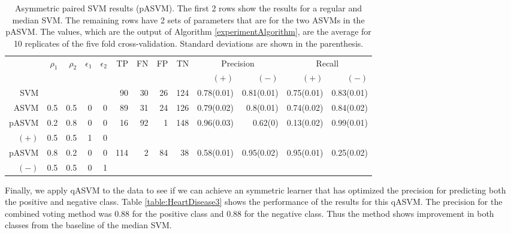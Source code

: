 \documentclass[twoside,11pt]{article}
\begin{document}
\begin{table}[htbp]\label{table:HeartDisease2}
  \centering
    \tiny\begin{tabular}{rrrrr|rrrrrrrr}
    \hline
    &\multirow{2}{*}{$\rho_1$} & \multirow{2}{*}{$\rho_2$} & \multirow{2}{*}{$\epsilon_1$} & \multirow{2}{*}{$\epsilon_2$} & \multirow{2}{*}{TP}    & \multirow{2}{*}{FN}    & \multirow{2}{*}{FP}    & \multirow{2}{*}{TN} & \multicolumn{2}{c}{Precision} & \multicolumn{2}{c}{Recall}\\
    &&&&&&&&&  $(+)$ &  $(-)$ &  $(+)$ &  $(-)$ \bigstrut\\

\hline
\hline
SVM &       &       &       &       & 90    & 30    & 26    & 124   & 0.78(0.01) & 0.81(0.01) & 0.75(0.01) & 0.83(0.01) \bigstrut\\
\hline
 ASVM & 0.5   & 0.5   & 0     & 0     & 89    & 31    & 24    & 126   & 0.79(0.02) & 0.8(0.01) & 0.74(0.02) & 0.84(0.02) \bigstrut\\
\hline
pASVM & 0.2   & 0.8   & 0     & 0     & 16    & 92    & 1     & 148   & 0.96(0.03) & 0.62(0) & 0.13(0.02) & 0.99(0.01) \bigstrut[t]\\
$(+)$   & 0.5   & 0.5   & 1     & 0     &       &       &       &       &       &       &       &  \bigstrut[b]\\
\hline
pASVM & 0.8   & 0.2   & 0     & 0     & 114   & 2     & 84    & 38    & 0.58(0.01) & 0.95(0.02) & 0.95(0.01) & 0.25(0.02) \bigstrut[t]\\
$(-)$   & 0.5   & 0.5   & 0     & 1     &       &       &       &       &       &       &       &  \bigstrut[b]\\
\hline
\hline
    \end{tabular}%
    \caption{Asymmetric paired SVM results (pASVM). The first 2 rows show the results for a regular and median SVM. The remaining rows have 2 sets of parameters that are for the two ASVMs in the pASVM. The values, which are the output of Algorithm \ref{experimentAlgorithm}, are the average for 10 replicates of the five fold cross-validation. Standard deviations are shown in the parenthesis.}
\end{table}%
Finally, we apply qASVM to the data to see if we can achieve an symmetric learner that has optimized the precision for predicting both the positive and negative class. Table \ref{table:HeartDisease3} shows the performance of the results for this qASVM. The precision for the combined voting method was 0.88 for the positive class and 0.88 for the negative class. Thus the method shows improvement in both classes from the baseline of the median SVM.
\end{document}
